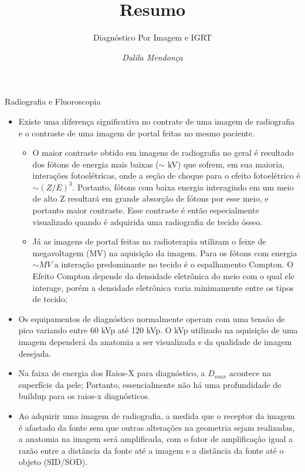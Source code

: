 \documentclass[11pt,a4paper]{article}
\title{Resumo}
\author{Diagnóstico Por Imagem e IGRT \nocite{*}}
\date{\textit{Dalila Mendonça}}
\newcounter{exemplo}
\begin{document}
	\maketitle


\begin{exemplo}

    \textcolor{CarnationPink}{Radiografia e Fluoroscopia}
    \begin{itemize}
        \item Existe uma diferença significativa no contrate de uma imagem de radiografia e o contraste de uma imagem de portal feitas no mesmo paciente. 
        \begin{itemize}[label=\textcolor{CarnationPink}{\textopenbullet}]
            \item O maior contraste obtido em imagens de radiografia no geral  é resultado dos fótons de energia mais baixas ($\sim$ kV) que sofrem, em sua maioria, interações fotoelétricas, onde a seção de choque para o efeito fotoelétrico é $\sim (Z/E)^3$. Portanto, fótons com baixa energia interagindo em um meio de alto Z resultará em grande absorção de fótons por esse meio, e portanto maior contraste. Esse contraste é então especialmente visualizado quando é adquirida uma radiografia de tecido ósseo.
            \item Já as imagens de portal feitas na radioterapia utilizam o feixe de megavoltagem (MV) na aquisição da imagem. Para os fótons com energia $\sim MV$ a interação predominante no tecido é o espalhamento Compton. O Efeito Compton depende da densidade eletrônica do meio com o qual ele interage, porém a densidade eletrônica varia minimamente entre os tipos de tecido;
        \end{itemize}

        \item Os equipamentos de diagnóstico normalmente operam com uma  tensão de pico variando entre 60 kVp até 120 kVp. O kVp utilizado na aquisição de uma imagem dependerá da anatomia a ser visualizada e da qualidade de imagem desejada.
        
        \item Na faixa de energia dos Raios-X para diagnóstico, a $D_{max}$ acontece na superfície da pele; Portanto, essencialmente não há uma profundidade de buildup para os raios-x diagnósticos.
        
        \item Ao adquirir uma imagem de radiografia, a medida que o receptor da imagem é afastado da fonte sem que outras alterações na geometria sejam realizadas, a anatomia na imagem será amplificada, com o fator de amplificação igual a razão entre a distância da fonte até a imagem e a distância da fonte até o objeto (SID/SOD).
        

\end{itemize}
\end{exemplo}
\end{document}
